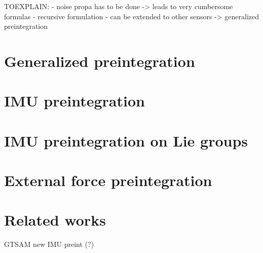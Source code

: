 TOEXPLAIN:
- noise propa has to be done -> leads to very cumbersome formulas
- recursive formulation
- can be extended to other sensors -> generalized preintegration

\section{Generalized preintegration}
\section{IMU preintegration}
\section{IMU preintegration on Lie groups}
\section{External force preintegration}


\section{Related works}

\cite{hartley2018legged}
\cite{wisth2020preintegrated}
\cite{lupton-09}
\cite{forster2017-TRO}
GTSAM new IMU preint (?)
\cite{eckenhoff2019closed}
\cite{brossard2021associating}
\cite{luo2021unified} 